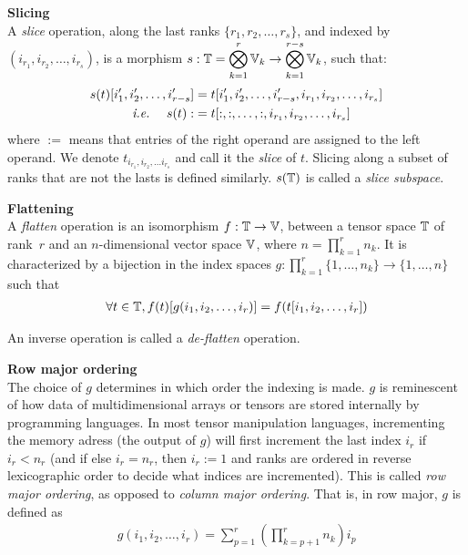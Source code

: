 \begin{definition}\textbf{Slicing}\\
A \emph{slice} operation, along the last ranks $\{r_1, r_2, \ldots, r_s\}$, and indexed by $(i_{r_1}, i_{r_2}, \ldots, i_{r_s})$, is a morphism $s: \mathbb{T} = \displaystyle \bigotimes_{k=1}^r \mathbb{V}_k \rightarrow \displaystyle \bigotimes_{k=1}^{r-s} \mathbb{V}_k$, such that:
\begin{align*}
s(t)[i'_1, i'_2, \ldots, i'_{r-s}] &= t[i'_1, i'_2, \ldots, i'_{r-s}, i_{r_1}, i_{r_2}, \ldots, i_{r_s}] \\
\text{ \emph{i.e.}~} \quad s(t) :&= t[:,:, \ldots, :, i_{r_1}, i_{r_2}, \ldots, i_{r_s}]
\end{align*}
where $:=$ means that entries of the right operand are assigned to the left operand.
We denote $t_{i_{r_1}, i_{r_2}, \ldots i_{r_s}}$ and call it the \emph{slice} of $t$. 
Slicing along a subset of ranks that are not the lasts is defined similarly.
$s(\mathbb{T})$ is called a \emph{slice subspace}.
\end{definition}

\begin{definition}\textbf{Flattening}\\
A \emph{flatten} operation is an isomorphism $f: \mathbb{T} \rightarrow \mathbb{V}$, between a tensor space $\mathbb{T}$ of rank~$r$ and an $n$-dimensional vector space $\mathbb{V}$, where $n =\displaystyle \prod_{k=1}^r n_k$. It is characterized by a bijection in the index spaces $g: \displaystyle \prod_{k=1}^r \{1, \ldots, n_k \} \rightarrow\{1, \ldots, n \}$ such that
\begin{gather*}
  \forall t \in \mathbb{T}, f(t)[g(i_1, i_2, \ldots, i_r)] = f(t[i_1, i_2, \ldots, i_r])
\end{gather*}

An inverse operation is called a \emph{de-flatten} operation.
\end{definition}

\begin{remark}\textbf{Row major ordering}\\
The choice of $g$ determines in which order the indexing is made. $g$ is reminescent of how data of multidimensional arrays or tensors are stored internally by programming languages. In most tensor manipulation languages, incrementing the memory adress (\ie the output of $g$) will first increment the last index $i_r$ if $i_r < n_r$ (and if else $i_r = n_r$, then $i_r := 1$ and ranks are ordered in reverse lexicographic order to decide what indices are incremented). This is called \emph{row major ordering}, as opposed to \emph{column major ordering}. That is, in row major, $g$ is defined as
\begin{align}
  g(i_1, i_2, \ldots, i_r) = \displaystyle \sum_{p=1}^r \left( \prod_{k=p+1}^r n_k \right) i_p \label{rowmajor}
\end{align}
\end{remark}

